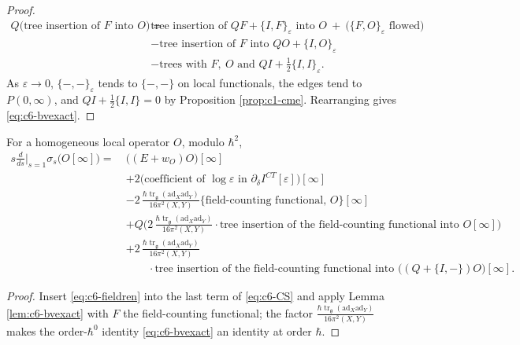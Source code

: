 \begin{proof}
\[
\begin{aligned}
Q\big(\text{tree insertion of }F\text{ into }O\big)=\ &\text{tree insertion of }QF+\{I,F\}_\varepsilon\text{ into }O\ +\ \big(\{F,O\}_\varepsilon\text{ flowed}\big)\\
&-\text{tree insertion of }F\text{ into }QO+\{I,O\}_\varepsilon\\
&-\text{trees with }F,\ O\text{ and }QI+\tfrac12\{I,I\}_\varepsilon .
\end{aligned}
\]
As $\varepsilon\to0$, $\{-,-\}_\varepsilon$ tends to $\{-,-\}$ on local functionals, the edges tend to $P(0,\infty)$, and $QI+\frac12\{I,I\}=0$ by Proposition \ref{prop:c1-cme}. Rearranging gives \eqref{eq:c6-bvexact}.
\end{proof}

\begin{corollary}
\label{cor:c6-fieldredef}
For a homogeneous local operator $O$, modulo $\hbar^2$,
\begin{equation}
\begin{aligned}
s\frac{d}{ds}\Big|_{s=1}\sigma_s\big(O[\infty]\big)=\ &\big((E+w_O)O\big)[\infty]\\
&+2\big(\text{coefficient of }\log\varepsilon\text{ in }\partial_\delta I^{CT}[\varepsilon]\big)[\infty]\\
&-2\,\frac{\hbar\operatorname{tr}_{\mathfrak g}(\mathrm{ad}_X\mathrm{ad}_Y)}{16\pi^2(X,Y)}\big\{\text{field-counting functional},\,O\big\}[\infty]\\
&+Q\Big(2\,\frac{\hbar\operatorname{tr}_{\mathfrak g}(\mathrm{ad}_X\mathrm{ad}_Y)}{16\pi^2(X,Y)}\cdot\text{tree insertion of the field-counting functional into }O[\infty]\Big)\\
&+2\,\frac{\hbar\operatorname{tr}_{\mathfrak g}(\mathrm{ad}_X\mathrm{ad}_Y)}{16\pi^2(X,Y)}\\
&\qquad\cdot\text{tree insertion of the field-counting functional into }\big((Q+\{I,-\})O\big)[\infty].
\end{aligned}
\label{eq:c6-fieldredef}
\end{equation}
\end{corollary}

\begin{proof}
Insert \eqref{eq:c6-fieldren} into the last term of \eqref{eq:c6-CS} and apply Lemma \ref{lem:c6-bvexact} with $F$ the field-counting functional; the factor $\frac{\hbar\operatorname{tr}_{\mathfrak g}(\mathrm{ad}_X\mathrm{ad}_Y)}{16\pi^2(X,Y)}$ makes the order-$\hbar^0$ identity \eqref{eq:c6-bvexact} an identity at order $\hbar$.
\end{proof}

